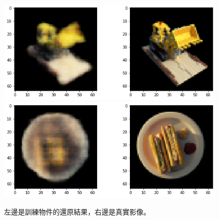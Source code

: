 \documentclass[10pt,twocolumn,letterpaper]{article}
\begin{document}
\begin{CJK}{UTF8}{bkai}
\begin{figure}
\begin{center}
         \includegraphics[width=1\linewidth]{img/experiment/train_3.png}
         \includegraphics[width=1\linewidth]{img/experiment/train_4.png}
      \end{center}
      \caption{
         左邊是訓練物件的還原結果，右邊是真實影像。
      }
      \label{fig:train_results}
   \end{figure}


\end{CJK}
\end{document}
